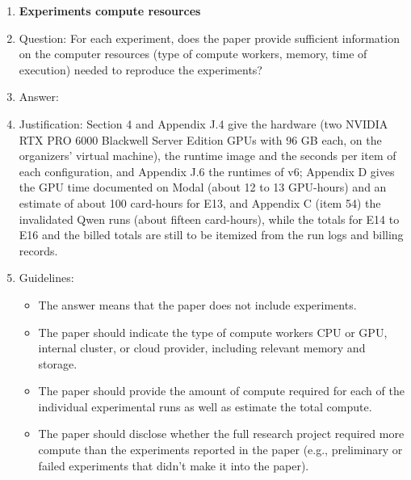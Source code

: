 \begin{enumerate}
\item {\bf Experiments compute resources}
    \item[] Question: For each experiment, does the paper provide sufficient information on the computer resources (type of compute workers, memory, time of execution) needed to reproduce the experiments?
    \item[] Answer: \answerYes{}
    \item[] Justification: Section 4 and Appendix J.4 give the hardware (two NVIDIA RTX PRO 6000 Blackwell Server Edition GPUs with 96 GB each, on the organizers' virtual machine), the runtime image and the seconds per item of each configuration, and Appendix J.6 the runtimes of v6; Appendix D gives the GPU time documented on Modal (about 12 to 13 GPU-hours) and an estimate of about 100 card-hours for E13, and Appendix C (item 54) the invalidated Qwen runs (about fifteen card-hours), while the totals for E14 to E16 and the billed totals are still to be itemized from the run logs and billing records.
    \item[] Guidelines:
    \begin{itemize}
        \item The answer \answerNA{} means that the paper does not include experiments.
        \item The paper should indicate the type of compute workers CPU or GPU, internal cluster, or cloud provider, including relevant memory and storage.
        \item The paper should provide the amount of compute required for each of the individual experimental runs as well as estimate the total compute. 
        \item The paper should disclose whether the full research project required more compute than the experiments reported in the paper (e.g., preliminary or failed experiments that didn't make it into the paper). 
    \end{itemize}
    

\end{enumerate}
